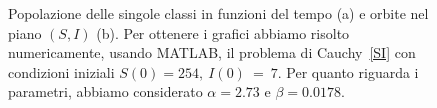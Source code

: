 \begin{figure}[ht]
\centering
\subfloat[][]{
\centering

}
\subfloat[][]
{

}
\caption[Analisi dei dati della peste di Eyam]{Popolazione delle singole classi  in funzioni del tempo (a) e orbite nel piano $(S,I)$ (b).  Per ottenere i grafici abbiamo risolto  numericamente, usando MATLAB,  il problema di Cauchy~\eqref{SI} con  condizioni iniziali $S(0)=254, ~I(0)~=~7$.  Per quanto riguarda i parametri, abbiamo considerato    $\alpha=2.73$  e $\beta= 0.0178$.}
\label{fig::sirsemplice}
\end{figure}



